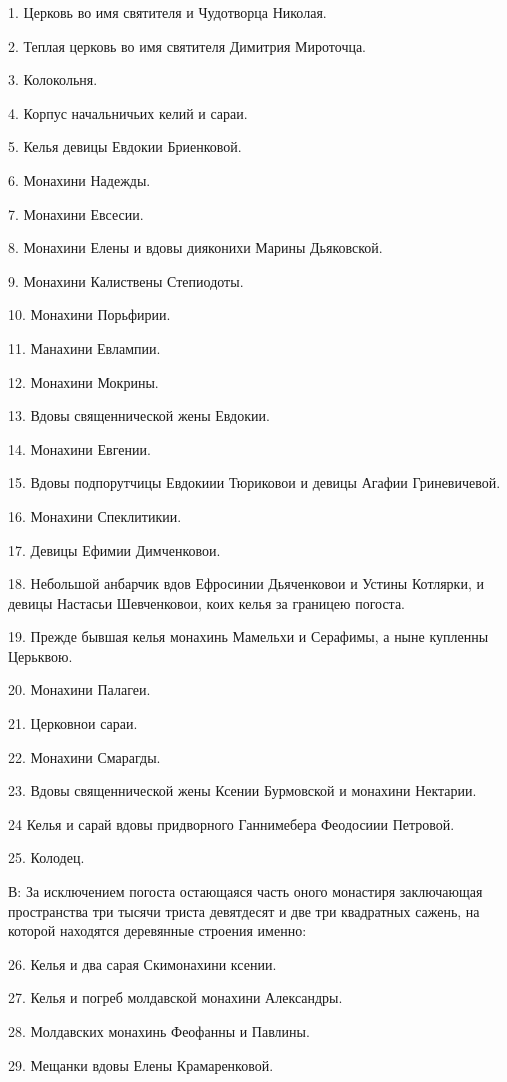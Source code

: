 1. Церковь во имя святителя и Чудотворца Николая.

2. Теплая церковь во имя святителя Димитрия Мироточца.

3. Колокольня. 

4. Корпус начальничьих келий и сараи.

5. Келья девицы Евдокии Бриенковой.

6. Монахини Надежды.

7. Монахини Евсесии.

8. Монахини Елены и вдовы дияконихи Марины Дьяковской.

9. Монахини Калиствены Степиодоты.

10. Монахини Порьфирии.

11. Манахини Евлампии.

12. Монахини Мокрины.

13. Вдовы священнической жены Евдокии.

14. Монахини Евгении.

15. Вдовы подпорутчицы Евдокиии Тюриковои и девицы Агафии Гриневичевой.

16. Монахини Спеклитикии.

17. Девицы Ефимии Димченковои.

18. Небольшой анбарчик вдов Ефросинии Дьяченковои и Устины Котлярки, и девицы Настасьи Шевченковои, коих келья за границею погоста.

19. Прежде бывшая келья монахинь Мамельхи и Серафимы, а ныне купленны Церьквою.

20. Монахини Палагеи.

21. Церковнои сараи.

22. Монахини Смарагды.

23. Вдовы священнической жены Ксении Бурмовской и монахини Нектарии.

24 Келья и сарай вдовы придворного Ганнимебера Феодосиии Петровой.

25. Колодец.

В: За исключением погоста остающаяся часть оного монастиря заключающая пространства три тысячи триста девятдесят и две три квадратных сажень, на которой находятся деревянные строения именно:

26. Келья и два сарая Скимонахини ксении.

27. Келья и погреб молдавской монахини Александры.

28. Молдавских монахинь Феофанны и Павлины.

29. Мещанки вдовы Елены Крамаренковой.


